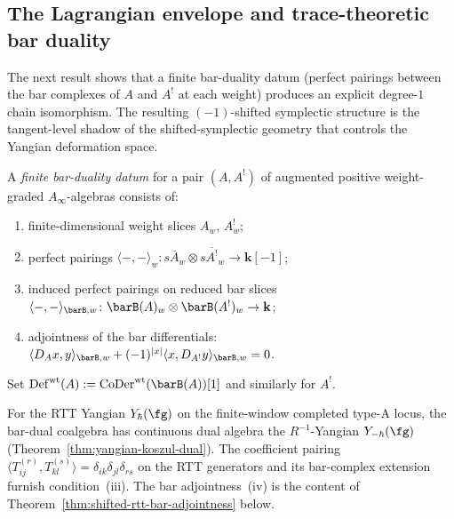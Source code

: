 \subsection{The Lagrangian envelope and trace-theoretic bar duality}
\label{subsec:lagrangian-envelope-trace-duality}

The next result shows that a finite bar-duality datum (perfect pairings
between the bar complexes of $A$ and $A^!$ at each weight) produces
an explicit degree-$1$ chain isomorphism. The resulting
$(-1)$-shifted symplectic structure is the tangent-level shadow of
the shifted-symplectic geometry that controls the Yangian deformation
space.

\begin{definition}
\label{def:shifted-rtt-bar-duality-datum}
A \emph{finite bar-duality datum} for a pair $(A, A^!)$ of augmented
positive weight-graded $A_\infty$-algebras consists of:
\begin{enumerate}[label=\textup{(\roman*)}]
\item finite-dimensional weight slices $A_w$, $A^!_w$;
\item perfect pairings
 $\langle{-},{-}\rangle_w \colon
 s\overline{A}_w \otimes s\overline{A^!}_w \to \mathbf{k}[-1]$;
\item induced perfect pairings on reduced bar slices
 $\langle{-},{-}\rangle_{\barB,w} \colon
 \barB(A)_w \otimes \barB(A^!)_w \to \mathbf{k}$;
\item adjointness of the bar differentials:
 $\langle D_A x, y \rangle_{\barB,w}
 + (-1)^{|x|}\langle x, D_{A^!}y\rangle_{\barB,w} = 0$.
\end{enumerate}
Set $\mathrm{Def}^{\mathrm{wt}}(A) :=
\mathrm{CoDer}^{\mathrm{wt}}(\barB(A))[1]$ and similarly for $A^!$.
\end{definition}

\begin{remark}
\label{rem:bar-duality-datum-source}
For the RTT Yangian $Y_\hbar(\fg)$ on the finite-window completed
type-A locus, the bar-dual coalgebra has continuous dual algebra the
$R^{-1}$-Yangian $Y_{-\hbar}(\fg)$
(Theorem~\ref{thm:yangian-koszul-dual}). The coefficient
pairing
$\langle T_{ij}^{(r)}, T_{kl}^{(s)}\rangle = \delta_{ik}
\delta_{jl}\delta_{rs}$
on the RTT generators and its bar-complex extension furnish
condition~(iii). The bar adjointness~(iv) is the content of
Theorem~\ref{thm:shifted-rtt-bar-adjointness} below.
\end{remark}


